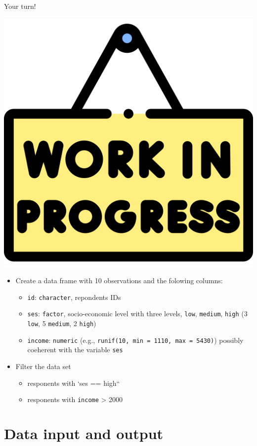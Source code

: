 \documentclass[
  ignorenonframetext,
]{beamer}
\providecommand{\tightlist}{%
  \setlength{\itemsep}{0pt}\setlength{\parskip}{0pt}}
\begin{document}
\begin{frame}[fragile]{Your turn!}
\protect\hypertarget{your-turn-5}{}
\begin{center}\includegraphics[width=0.19\linewidth]{img/work} \end{center}

\begin{itemize}
\tightlist
\item
  Create a data frame with 10 observations and the folowing columns:

  \begin{itemize}
  \tightlist
  \item
    \texttt{id}: \texttt{character}, repondents IDs
  \item
    \texttt{ses}: \texttt{factor}, socio-economic level with three
    levels, \texttt{low}, \texttt{medium}, \texttt{high} (3
    \texttt{low}, 5 \texttt{medium}, 2 \texttt{high})
  \item
    \texttt{income}: \texttt{numeric} (e.g.,
    \texttt{runif(10,\ min\ =\ 1110,\ max\ =\ 5430)}) possibly coeherent
    with the variable \texttt{ses}
  \end{itemize}
\item
  Filter the data set

  \begin{itemize}
  \tightlist
  \item
    responents with `ses == high``
  \item
    responents with \texttt{income} \textgreater{} 2000
  \end{itemize}
\end{itemize}
\end{frame}

\hypertarget{data-input-and-output}{%
\section{Data input and output}\label{data-input-and-output}}
\end{document}
